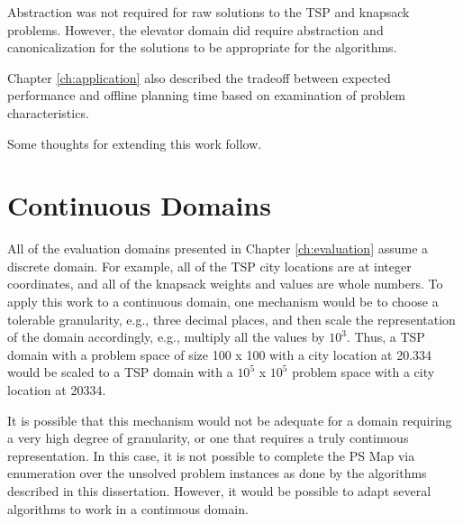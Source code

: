 Abstraction was not required for raw solutions to the TSP and knapsack problems.  However, the elevator domain did require abstraction and canonicalization for the solutions to be appropriate for the algorithms.

Chapter \ref{ch:application} also described the tradeoff between expected performance and offline planning time based on examination of problem characteristics.


Some thoughts for extending this work follow.

\section{Continuous Domains}
\label{sec:continuous-domains}
All of the evaluation domains presented in Chapter \ref{ch:evaluation} assume a discrete domain.  For example, all of the TSP city locations are at integer coordinates, and all of the knapsack weights and values are whole numbers.  To apply this work to a continuous domain, one mechanism would be to choose a tolerable granularity, e.g., three decimal places, and then scale the representation of the domain accordingly, e.g., multiply all the values by $10^3$.  Thus, a TSP domain with a problem space of size 100 x 100 with a city location at 20.334 would be scaled to a TSP domain with a $10^5$ x $10^5$ problem space with a city location at 20334.

It is possible that this mechanism would not be adequate for a domain requiring a very high degree of granularity, or one that requires a truly continuous representation.  In this case, it is not  possible to complete the PS Map via enumeration over the unsolved  problem instances as done by the algorithms  described in this dissertation.  However, it would be possible to adapt several algorithms to work in a continuous domain.

